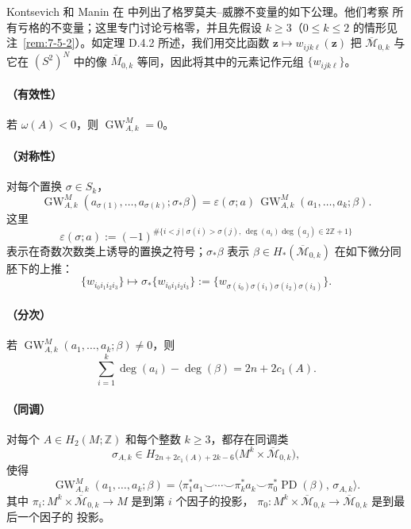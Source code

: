 Kontsevich 和 Manin 在  中列出了格罗莫夫--威滕不变量的如下公理。他们考察
所有亏格的不变量；这里专门讨论亏格零，并且先假设 $k\ge3$（$0\le k\le2$ 的情形见
注~\ref{rem:7-5-2}）。如定理 D.4.2 所述，我们用交比函数
$\mathbf z\mapsto w_{ijk\ell}(\mathbf z)$ 把 $\overline{\mathcal M}_{0,k}$ 与它在
$(S^2)^N$ 中的像 $\overline M_{0,k}$ 等同，因此将其中的元素记作元组
$\{w_{ijk\ell}\}$。

\paragraph{（有效性）}
若 $\omega(A)<0$，则 $\operatorname{GW}_{A,k}^M=0$。

\paragraph{（对称性）}
对每个置换 $\sigma\in S_k$，
\[
  \operatorname{GW}_{A,k}^M
  (a_{\sigma(1)},\ldots,a_{\sigma(k)};\sigma_*\beta)
  =\varepsilon(\sigma;a)\,
  \operatorname{GW}_{A,k}^M(a_1,\ldots,a_k;\beta).
\]
这里
\[
  \varepsilon(\sigma;a)
  :=(-1)^{\#\{i<j\mid \sigma(i)>\sigma(j),\,
                  \deg(a_i)\deg(a_j)\in2\mathbb Z+1\}}
\]
表示在奇数次数类上诱导的置换之符号；$\sigma_*\beta$ 表示
$\beta\in H_*(\overline{\mathcal M}_{0,k})$ 在如下微分同胚下的上推：
\[
  \{w_{i_0i_1i_2i_3}\}
  \longmapsto
  \sigma_*\{w_{i_0i_1i_2i_3}\}
  :=\{w_{\sigma(i_0)\sigma(i_1)\sigma(i_2)\sigma(i_3)}\}.
\]

\paragraph{（分次）}
若 $\operatorname{GW}_{A,k}^M(a_1,\ldots,a_k;\beta)\ne0$，则
\[
  \sum_{i=1}^k\deg(a_i)-\deg(\beta)=2n+2c_1(A).
\]

\paragraph{（同调）}
对每个 $A\in H_2(M;\mathbb Z)$ 和每个整数 $k\ge3$，都存在同调类
\[
  \sigma_{A,k}\in
  H_{2n+2c_1(A)+2k-6}
  \bigl(M^k\times\overline{\mathcal M}_{0,k}\bigr),
\]
使得
\[
  \operatorname{GW}_{A,k}^M(a_1,\ldots,a_k;\beta)
  =\bigl\langle
    \pi_1^*a_1\smile\cdots\smile\pi_k^*a_k
      \smile\pi_0^*\operatorname{PD}(\beta),\,
    \sigma_{A,k}\bigr\rangle.
\]
其中 $\pi_i:M^k\times\overline{\mathcal M}_{0,k}\to M$ 是到第 $i$ 个因子的投影，
$\pi_0:M^k\times\overline{\mathcal M}_{0,k}\to\overline{\mathcal M}_{0,k}$ 是到最后一个因子的
投影。

